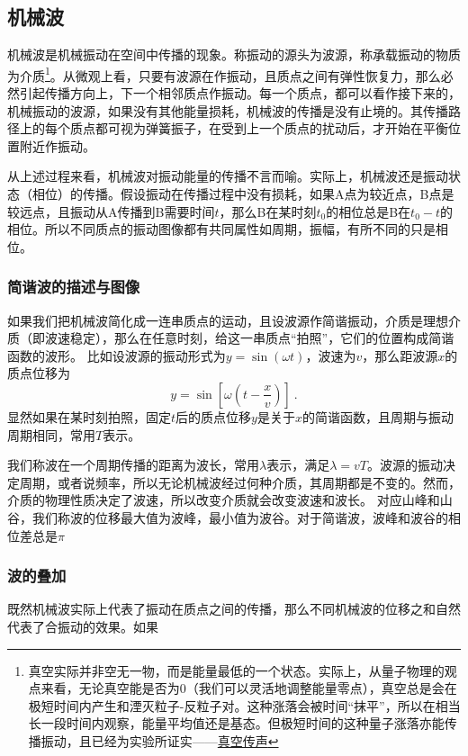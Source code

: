 
\subsection{机械波}
机械波是机械振动在空间中传播的现象。称振动的源头为波源，称承载振动的物质为介质\footnote{真空实际并非空无一物，而是能量最低的一个状态。实际上，从量子物理的观点来看，无论真空能是否为0（我们可以灵活地调整能量零点），真空总是会在极短时间内产生和湮灭粒子-反粒子对。这种涨落会被时间“抹平”，所以在相当长一段时间内观察，能量平均值还是基态。但极短时间的这种量子涨落亦能传播振动，且已经为实验所证实——\href{https://www.rmzxw.com.cn/c/2023-08-25/3399291.shtml}{真空传声}}。从微观上看，只要有波源在作振动，且质点之间有弹性恢复力，那么必然引起传播方向上，下一个相邻质点作振动。每一个质点，都可以看作接下来的，机械振动的波源，如果没有其他能量损耗，机械波的传播是没有止境的。其传播路径上的每个质点都可视为弹簧振子，在受到上一个质点的扰动后，才开始在平衡位置附近作振动。

从上述过程来看，机械波对振动能量的传播不言而喻。实际上，机械波还是振动状态（相位）的传播。假设振动在传播过程中没有损耗，如果A点为较近点，B点是较远点，且振动从A传播到B需要时间$t$，那么B在某时刻$t_0$的相位总是B在$t_0-t$的相位。所以不同质点的振动图像都有共同属性如周期，振幅，有所不同的只是相位。
\subsubsection{简谐波的描述与图像}
如果我们把机械波简化成一连串质点的运动，且设波源作简谐振动，介质是理想介质（即波速稳定），那么在任意时刻，给这一串质点“拍照”，它们的位置构成简谐函数的波形。
比如设波源的振动形式为$y=\sin(\omega t)$，波速为$v$，那么距波源$x$的质点位移为
\begin{equation}
y=\sin [\omega (t-\frac{x}{v})]~.
\end{equation}
显然如果在某时刻拍照，固定$t$后的质点位移$y$是关于$x$的简谐函数，且周期与振动周期相同，常用$T$表示。%

我们称波在一个周期传播的距离为波长，常用$\lambda $表示，满足$\lambda=vT$。波源的振动决定周期，或者说频率，所以无论机械波经过何种介质，其周期都是不变的。然而，介质的物理性质决定了波速，所以改变介质就会改变波速和波长。
对应山峰和山谷，我们称波的位移最大值为波峰，最小值为波谷。对于简谐波，波峰和波谷的相位差总是$\pi$

\subsubsection{波的叠加}
既然机械波实际上代表了振动在质点之间的传播，那么不同机械波的位移之和自然代表了合振动的效果。如果
